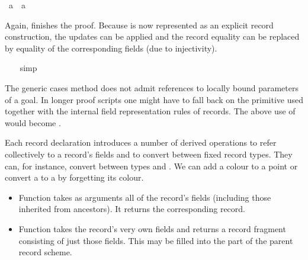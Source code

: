 \begin{isabellebody}
\begin{isamarkuptxt}
\begin{isabelle}
\ a\ {}\ a{}%
\end{isabelle} Again,  finishes the proof.  Because  is now represented as
  an explicit record construction, the updates can be applied and the
  record equality can be replaced by equality of the corresponding
  fields (due to injectivity).%
\end{isamarkuptxt}%
\isamarkuptrue%
\ \ \isamarkupfalse%
\ simp\isanewline
\ \ \isamarkupfalse%
%
\endisatagproof
{\isafoldproof}%
%
\isadelimproof
%
\endisadelimproof
%
\begin{isamarkuptext}%
The generic cases method does not admit references to locally bound
  parameters of a goal.  In longer proof scripts one might have to
  fall back on the primitive  used together with the
  internal field representation rules of records.  The above use of
   would become .%
\end{isamarkuptext}%
\isamarkuptrue%
%
\isamarkuptrue%
%
\begin{isamarkuptext}%
Each record declaration introduces a number of derived operations to
  refer collectively to a record's fields and to convert between fixed
  record types.  They can, for instance, convert between types  and .  We can add a colour to a point or convert
  a  to a  by forgetting its colour.

  \begin{itemize}

  \item Function  takes as arguments all of the record's
  fields (including those inherited from ancestors).  It returns the
  corresponding record.

  \item Function  takes the record's very own fields and
  returns a record fragment consisting of just those fields.  This may
  be filled into the  part of the parent record scheme.


\end{itemize}
\end{isamarkuptext}
\end{isabellebody}
